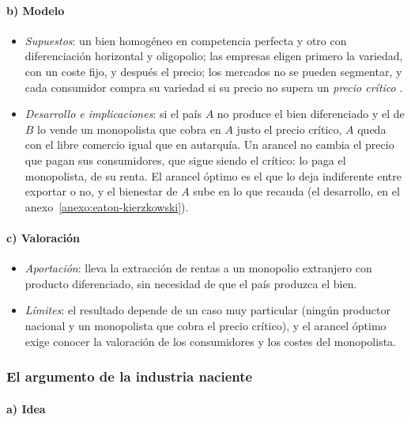 \documentclass[11pt]{article}
\begin{document}
\paragraph{b) Modelo}

\begin{itemize}
\item \emph{Supuestos}: un bien homogéneo en competencia perfecta y otro con diferenciación horizontal y oligopolio; las empresas eligen primero la variedad, con un coste fijo, y después el precio; los mercados no se pueden segmentar, y cada consumidor compra su variedad si su precio no supera un \emph{precio crítico} .
\item \emph{Desarrollo e implicaciones}: si el país $A$ no produce el bien diferenciado y el de $B$ lo vende un monopolista que cobra en $A$ justo el precio crítico, $A$ queda con el libre comercio igual que en autarquía. Un arancel no cambia el precio que pagan sus consumidores, que sigue siendo el crítico: lo paga el monopolista, de su renta. El arancel óptimo es el que lo deja indiferente entre exportar o no, y el bienestar de $A$ sube en lo que recauda (el desarrollo, en el anexo~\ref{anexo:eaton-kierzkowski}).
\end{itemize}

\paragraph{c) Valoración}

\begin{itemize}
\item \emph{Aportación}: lleva la extracción de rentas a un monopolio extranjero con producto diferenciado, sin necesidad de que el país produzca el bien.
\item \emph{Límites}: el resultado depende de un caso muy particular (ningún productor nacional y un monopolista que cobra el precio crítico), y el arancel óptimo exige conocer la valoración de los consumidores y los costes del monopolista.
\end{itemize}

\subsubsection{El argumento de la industria naciente}\label{sec:industria-naciente}

\paragraph{a) Idea}
\end{document}
